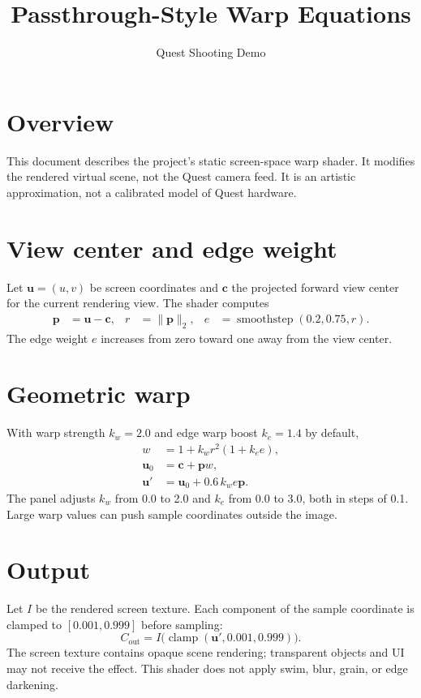 \documentclass[11pt,a4paper]{article}
\title{Passthrough-Style Warp Equations}
\author{Quest Shooting Demo}
\date{}
\newcommand{\clamp}{\operatorname{clamp}}
\newcommand{\smoothstep}{\operatorname{smoothstep}}
\begin{document}
\maketitle

\section{Overview}
This document describes the project's static screen-space warp shader. It
modifies the rendered virtual scene, not the Quest camera feed. It is an
artistic approximation, not a calibrated model of Quest hardware.

\section{View center and edge weight}
Let $\mathbf{u}=(u,v)$ be screen coordinates and $\mathbf{c}$ the projected
forward view center for the current rendering view. The shader computes
\begin{align}
  \mathbf{p} &= \mathbf{u}-\mathbf{c}, &
  r &= \lVert \mathbf{p}\rVert_2, &
  e &= \smoothstep(0.2,0.75,r).
\end{align}
The edge weight $e$ increases from zero toward one away from the view center.

\section{Geometric warp}
With warp strength $k_w=2.0$ and edge warp boost $k_e=1.4$ by default,
\begin{align}
  w &= 1+k_w r^2(1+k_e e),\\
  \mathbf{u}_0 &= \mathbf{c}+\mathbf{p}w,\\
  \mathbf{u}' &= \mathbf{u}_0+0.6\,k_w e\mathbf{p}.
\end{align}
The panel adjusts $k_w$ from 0.0 to 2.0 and $k_e$ from 0.0 to 3.0, both in
steps of 0.1. Large warp values can push sample coordinates outside the image.

\section{Output}
Let $I$ be the rendered screen texture. Each component of the sample coordinate
is clamped to $[0.001,0.999]$ before sampling:
\begin{equation}
  C_{\text{out}}=I\bigl(\clamp(\mathbf{u}',0.001,0.999)\bigr).
\end{equation}
The screen texture contains opaque scene rendering; transparent objects and
UI may not receive the effect. This shader does not apply swim, blur, grain,
or edge darkening.
\end{document}
